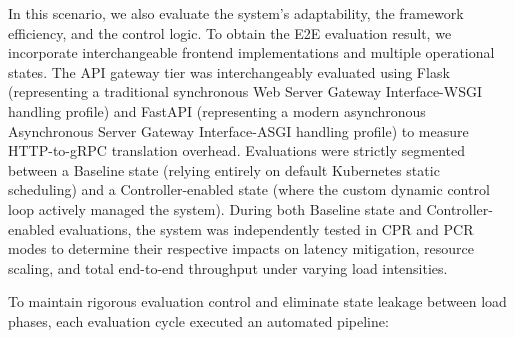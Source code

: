 \documentclass{ieeeaccess}
\begin{document}
In this scenario, we also evaluate the system's adaptability, the framework efficiency, and the control logic. To obtain the E2E evaluation result, we incorporate interchangeable frontend implementations and multiple operational states. The API gateway tier was interchangeably evaluated using Flask (representing a traditional synchronous Web Server Gateway Interface-WSGI \cite{wsgi} handling profile) and FastAPI (representing a modern asynchronous Asynchronous Server Gateway Interface-ASGI \cite{asgi} handling profile) to measure HTTP-to-gRPC translation overhead. Evaluations were strictly segmented between a Baseline state (relying entirely on default Kubernetes static scheduling) and a Controller-enabled state (where the custom dynamic control loop actively managed the system). During both Baseline state and Controller-enabled evaluations, the system was independently tested in CPR and PCR modes to determine their respective impacts on latency mitigation, resource scaling, and total end-to-end throughput under varying load intensities.

To maintain rigorous evaluation control and eliminate state leakage between load phases, each evaluation cycle executed an automated pipeline:
\end{document}
